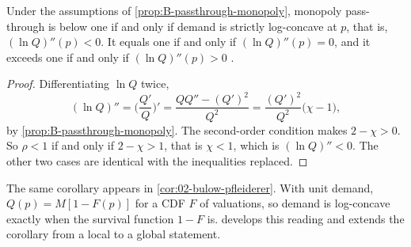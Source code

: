 \begin{corollary}\label{cor:B-passthrough-logconcave}
Under the assumptions of \cref{prop:B-passthrough-monopoly}, monopoly pass-through is below one if and only if
demand is strictly log-concave at $p$, that is, $(\ln Q)''(p) < 0$. It equals one if and only if $(\ln Q)''(p) = 0$,
and it exceeds one if and only if $(\ln Q)''(p) > 0$ \citep{BulowPfleiderer1983}.
\end{corollary}

\begin{proof}
Differentiating $\ln Q$ twice,
\begin{equation*}
(\ln Q)'' = \Big(\frac{Q'}{Q}\Big)' = \frac{QQ'' - (Q')^2}{Q^2} = \frac{(Q')^2}{Q^2}\big(\chi - 1\big) ,
\end{equation*}
by \cref{prop:B-passthrough-monopoly}. The second-order condition makes $2 - \chi > 0$. So $\rho < 1$ if and only if
$2 - \chi > 1$, that is $\chi < 1$, which is $(\ln Q)'' < 0$. The other two cases are identical with the
inequalities replaced.
\end{proof}

The same corollary appears in \cref{cor:02-bulow-pfleiderer}. With unit demand, $Q(p) = M[1 - F(p)]$ for a CDF $F$
of valuations, so demand is log-concave exactly when the survival function $1 - F$ is. 
develops this reading and extends the corollary from a local to a global statement.

